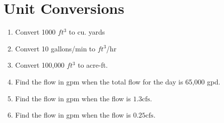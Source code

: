 \documentclass{article}
\begin{document}
\section{Unit Conversions}
\begin{enumerate}
\item Convert 1000 $ft^3$ to cu. yards\\

\item Convert 10 gallons/min to $ft^3$/hr\\

\item Convert 100,000 $ft^3$ to acre-ft.\\

\item Find the flow in gpm when the total flow for the day is 65,000 gpd.

\item Find the flow in gpm when the flow is $1.3 \mathrm{cfs}$.

\item Find the flow in gpm when the flow is $0.25 \mathrm{cfs}$.
\end{enumerate}
\end{document}
